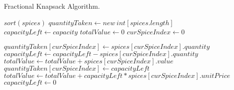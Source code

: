 \documentclass[letterpaper, 10pt,DIV=13]{scrartcl}
\numberwithin{equation}{section} %
\numberwithin{figure}{section} %
\numberwithin{table}{section} %
\begin{document}
\begin{algorithm}
  \caption{Fractional Knapsack Algorithm.}
  \label{algorithm:fracKnapsack}
  \begin{algorithmic}[1]
      \State $sort(spices)$ 
      \State $quantityTaken \gets new~int[spices.length]$ 
      \State $capacityLeft \gets capacity$ 
      \State $totalValue \gets 0$ 
      \State $curSpiceIndex \gets 0$ 

         
          \State $quantityTaken[curSpiceIndex] \gets spices[curSpiceIndex].quantity$
          \State $capacityLeft \gets capacityLeft - spices[curSpiceIndex].quantity$
          \State $totalValue \gets totalValue + spices[curSpiceIndex].value$ 
        \Else {}
          \State $quantityTaken[curSpiceIndex] \gets capacityLeft$
          \State $totalValue \gets totalValue + capacityLeft * spices[curSpiceIndex].unitPrice$
          \State $capacityLeft \gets 0$
        \EndIf

         
      \EndWhile
      \State {}
    \EndProcedure
  \end{algorithmic}
\end{algorithm}
\end{document}
